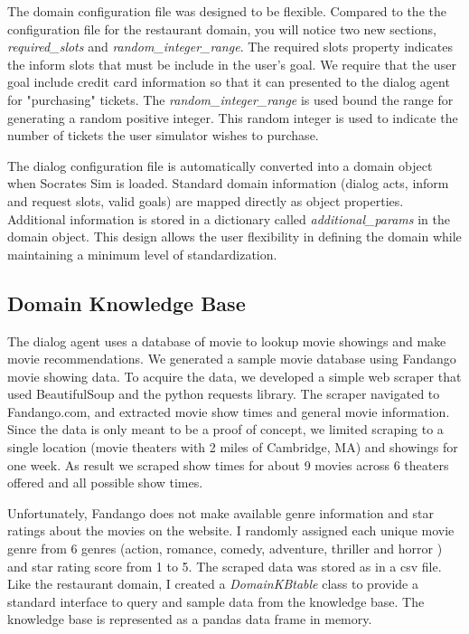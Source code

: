 The  domain configuration file was designed to be flexible. Compared to the the configuration file for the restaurant domain, you will notice two new sections, \textit{required\_slots} and \textit{random\_integer\_range}. The required slots property indicates the inform slots that must be include in the user's goal. We require that the user goal include credit card information so that it can presented to the dialog agent for "purchasing" tickets. The \textit{random\_integer\_range} is used bound the range for generating a random positive integer. This random integer is used to indicate the number of tickets the user simulator wishes to purchase. 

The dialog configuration file is automatically converted into a domain object when Socrates Sim is loaded. Standard domain information (dialog acts, inform and request slots, valid goals) are mapped directly as object properties. Additional information is stored in a dictionary called \textit{additional\_params} in the domain object. This design allows the user flexibility in defining the domain while maintaining a minimum level of standardization. 

\subsection{Domain Knowledge Base}

The dialog agent uses a database of movie to lookup movie showings and make movie recommendations. We generated a sample movie database using Fandango movie showing data. To acquire the data, we developed a simple web scraper that used BeautifulSoup and the python requests library. The scraper navigated to Fandango.com, and extracted movie show times and general movie information. Since the data is only meant to be a proof of concept, we limited scraping to a single location (movie theaters with 2 miles of Cambridge, MA) and showings for one week. As result we scraped show times for about 9 movies across 6 theaters offered and all possible show times. 

Unfortunately, Fandango does not make available genre information and star ratings about the movies on the website. I randomly assigned each unique movie genre from 6 genres (action, romance, comedy, adventure, thriller and horror ) and star rating score from 1 to 5. The scraped data was stored as in a csv file. Like the restaurant domain, I created a \textit{DomainKBtable} class to provide a standard interface to query and sample data from the knowledge base. The knowledge base is represented as a pandas data frame in memory. 

